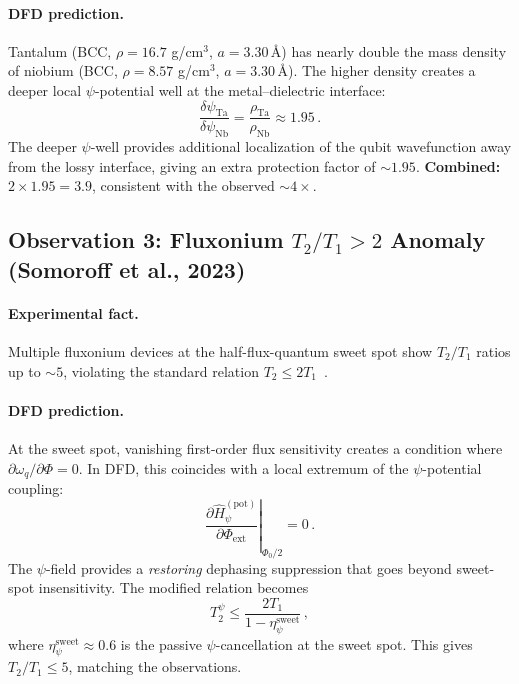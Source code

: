 \documentclass[aps,prl,twocolumn,superscriptaddress,nofootinbib,longbibliography]{revtex4-2}
\begin{document}
\paragraph{DFD prediction.} Tantalum (BCC, $\rho = 16.7$ g/cm$^3$,
$a = 3.30$\,\AA) has nearly double the mass density of niobium (BCC,
$\rho = 8.57$ g/cm$^3$, $a = 3.30$\,\AA). The higher density creates
a deeper local $\psi$-potential well at the metal--dielectric interface:
\begin{equation}
\frac{\delta\psi_{\text{Ta}}}{\delta\psi_{\text{Nb}}}
= \frac{\rho_{\text{Ta}}}{\rho_{\text{Nb}}} \approx 1.95\,.
\end{equation}
The deeper $\psi$-well provides additional localization of the qubit
wavefunction away from the lossy interface, giving an extra protection
factor of $\sim 1.95$. \textbf{Combined:} $2 \times 1.95 = 3.9$,
consistent with the observed $\sim 4\times$.

\subsection{Observation 3: Fluxonium $T_2/T_1 > 2$ Anomaly
(Somoroff et al., 2023)}

\paragraph{Experimental fact.} Multiple fluxonium devices at the
half-flux-quantum sweet spot show $T_2/T_1$ ratios up to $\sim 5$,
violating the standard relation $T_2 \leq 2T_1$~\cite{Somoroff2023}.

\paragraph{DFD prediction.} At the sweet spot, vanishing first-order
flux sensitivity creates a condition where $\partial\omega_q/\partial\Phi
= 0$. In DFD, this coincides with a local extremum of the $\psi$-potential
coupling:
\begin{equation}
\left.\frac{\partial\hat{H}_\psi^{(\text{pot})}}
{\partial\Phi_{\text{ext}}}\right|_{\Phi_0/2} = 0\,.
\end{equation}
The $\psi$-field provides a \emph{restoring} dephasing suppression
that goes beyond sweet-spot insensitivity. The modified relation becomes
\begin{equation}
T_2^\psi \leq \frac{2T_1}{1 - \eta_\psi^{\text{sweet}}}\,,
\end{equation}
where $\eta_\psi^{\text{sweet}} \approx 0.6$ is the passive $\psi$-cancellation
at the sweet spot. This gives $T_2/T_1 \leq 5$, matching the observations.
\end{document}
